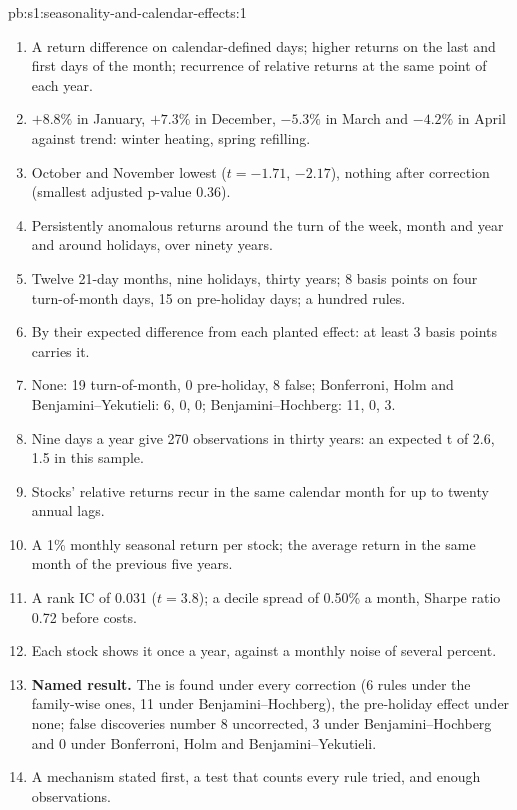 \begin{solution}{pb:s1:seasonality-and-calendar-effects:1}
\begin{enumerate}
\item A return difference on calendar-defined days; higher returns on the last and first days of the month; recurrence of relative returns at the same
point of each year.
\item $+8.8\%$ in January, $+7.3\%$ in December, $-5.3\%$ in March and $-4.2\%$ in April against trend: winter heating, spring refilling.
\item October and November lowest ($t = -1.71$, $-2.17$), nothing after correction (smallest adjusted p-value 0.36).
\item Persistently anomalous returns around the turn of the week, month and year and around holidays, over ninety years.
\item Twelve 21-day months, nine holidays, thirty years; 8 basis points on four turn-of-month days, 15 on pre-holiday days; a hundred rules.
\item By their expected difference from each planted effect: at least 3 basis points carries it.
\item None: 19 turn-of-month, 0 pre-holiday, 8 false; Bonferroni, Holm and Benjamini--Yekutieli: 6, 0, 0; Benjamini--Hochberg: 11, 0, 3.
\item Nine days a year give 270 observations in thirty years: an expected t of 2.6, 1.5 in this sample.
\item Stocks' relative returns recur in the same calendar month for up to twenty annual lags.
\item A 1\% monthly seasonal return per stock; the average return in the same month of the previous five years.
\item A rank IC of 0.031 ($t = 3.8$); a decile spread of 0.50\% a month, Sharpe ratio 0.72 before costs.
\item Each stock shows it once a year, against a monthly noise of several percent.
\item \textbf{Named result.} The  is found under every correction (6 rules under the family-wise ones, 11 under
Benjamini--Hochberg), the pre-holiday effect under none; false discoveries number 8 uncorrected, 3 under Benjamini--Hochberg and 0 under Bonferroni,
Holm and Benjamini--Yekutieli.
\item A mechanism stated first, a test that counts every rule tried, and enough observations.

\end{enumerate}
\end{solution}
